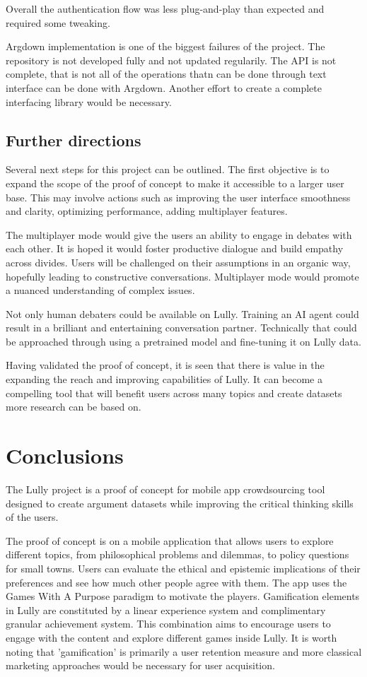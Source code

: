 \documentclass{report}
\begin{document}
Overall the authentication flow was less plug-and-play than expected and required some tweaking. 

Argdown implementation is one of the biggest failures of the project. The repository is not developed fully and not updated regularily. The API is not complete, that is not all of the operations thatn can be done through text interface can be done with Argdown. Another effort to create a complete interfacing library would be necessary.

\section{Further directions}
Several next steps for this project can be outlined. The first objective is to expand the scope of the proof of concept to make it accessible to a larger user base. This may involve actions such as improving the user interface smoothness and clarity, optimizing performance, adding multiplayer features.

The multiplayer mode would give the users an ability to engage in debates with each other. It is hoped it would foster productive dialogue and build empathy across divides.
Users will be challenged on their assumptions in an organic way, hopefully leading to constructive conversations. Multiplayer mode would promote a nuanced understanding of complex issues.

Not only human debaters could be available on Lully. Training an AI agent could result in a brilliant and entertaining conversation partner. Technically that could be approached through using a pretrained model and fine-tuning it on Lully data.

Having validated the proof of concept, it is seen that there is value in the expanding the reach and improving capabilities of Lully. It can become a compelling tool that will benefit users across many topics and create datasets more research can be based on.

\newpage

\chapter{Conclusions}

The Lully project is a proof of concept for mobile app crowdsourcing tool designed to create argument datasets while improving the critical thinking skills of the users. 

The proof of concept is on a mobile application that allows users to explore different topics, from philosophical problems and dilemmas, to policy questions for small towns. Users can evaluate the ethical and epistemic implications of their preferences and see how much other people agree with them. The app uses the Games With A Purpose paradigm to motivate the players. Gamification elements in Lully are constituted by a linear experience system and complimentary granular achievement system. This combination aims to encourage users to engage with the content and explore different games inside Lully. It is worth noting that 'gamification' is primarily a user retention measure and more classical marketing approaches would be necessary for user acquisition.
\end{document}
